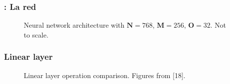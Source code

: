 \begin{frame}[shrink=13]
\frametitle{: La red}
\begin{figure}[H]
\centering
{}
\caption{Neural network architecture with $\bm{N}=768$, $\bm{M}=256$, $\bm{O}=32$. Not to scale.}
\end{figure}
\end{frame}

\begin{frame}
\frametitle{Linear layer}
\begin{figure}[H]
\centering
{}%
\qquad
{}%
\caption{Linear layer operation comparison. Figures from [18].}
\end{figure}
\end{frame}

